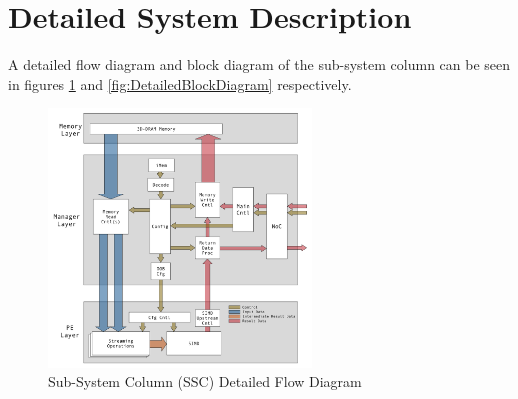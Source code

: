 \documentclass[journal]{IEEEtran}
\begin{document}
\fi

\iffalse


\section{Detailed System Description}
\label{sec:detailedSystemDescription}

A detailed flow diagram and block diagram of the sub-system column can be seen in figures \ref{fig:DetailedFlowDiagram} and \ref{fig:DetailedBlockDiagram} respectively.
\begin{figure}[!t]
\centering
\captionsetup{justification=centering}
\captionsetup{width=.9\linewidth}
\centerline{
\mbox{\includegraphics[width=2.75in]{DetailedFlowDiagram.jpg}}
}
\center\caption{Sub-System Column (SSC) Detailed Flow Diagram}
\label{fig:DetailedFlowDiagram}
\end{figure}
\end{document}
